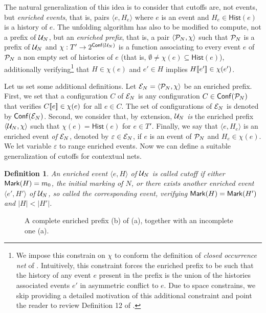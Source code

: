 \documentclass[11pt,a4paper]{article}
\newtheorem{definition}[theorem]{Definition}
\newcommand{\hist}[1]{\ensuremath{\mathsf{Hist}(#1)}}
\newcommand{\conf}[1]{\ensuremath{\mathsf{Conf}(#1)}}
\begin{document}
The natural generalization of this idea is to consider that cutoffs are, not
events, but \emph{enriched events}, that is, pairs $\langle e, H_e \rangle$
where $e$ is an event and $H_e \in \hist e$ is a history of $e$.  The unfolding
algorithm has also to be modified to compute, not a prefix of $\mathcal{U}_{N}$, but an
\emph{enriched prefix}, that is, a pair $\langle \mathcal{P}_{N}, \chi \rangle$ such
that $\mathcal{P}_{N}$ is a prefix of $\mathcal{U}_{N}$ and $\chi : T' \to 2^{\conf{\unf N}}$ is
a function associating to every event $e$ of $\mathcal{P}_{N}$ a non empty set of
histories of $e$ (that is, $\emptyset \not = \chi(e) \subseteq \hist{e}$),
additionally verifying\footnote{We impose this constrain on $\chi$ to conform
the definition of \emph{closed occurrence net} of .  Intuitively,
this constraint forces the enriched prefix to be such that the history of any
event $e$ present in the prefix is the union of the histories associated events
$e'$ in asymmetric conflict to $e$.  Due to space constrains, we skip providing
a detailed motivation of this additional constraint and point the reader to
review Definition 12 of .} that $H \in \chi (e)$ and $e' \in H$
implies $H [\![ e']\!] \in \chi (e')$.

Let us set some additional definitions. Let $\mathcal{E}_{N} = \langle \mathcal{P}_{N}, \chi
\rangle$ be an enriched prefix.  First, we set that a configuration $C$ of
$\mathcal{E}_{N}$ is any configuration $C \in \conf{\pref N}$ that verifies $C [\![ e]\!]
\in \chi (e)$ for all $e \in C$.  The set of configurations of $\mathcal{E}_{N}$ is
denoted by $\conf{\enr N}$.  Second, we consider that, by extension, $\mathcal{U}_{N}$
\emph{is} the enriched prefix $\langle \mathcal{U}_{N}, \chi \rangle$ such that $\chi
(e) = \hist{e}$ for $e \in T'$.  Finally, we say that $\langle e, H_e \rangle$
is an enriched event \emph{of} $\mathcal{E}_{N}$, denoted by $\varepsilon \in \mathcal{E}_{N}$,
if $e$ is an event of $\mathcal{P}_{N}$ and $H_e \in \chi (e)$.  We let variable
$\varepsilon$ to range enriched events.  Now we can define a suitable
generalization of cutoffs for contextual nets.

\begin{definition}
\label{def:cutoff}
An enriched event $\langle e, H \rangle$ of $\mathcal{U}_{N}$ is called \emph{cutoff} if
either $\mathsf{Mark }{(H)} = m_0$, the initial marking of $N$, or there exists another
enriched event $\langle e', H' \rangle$ of $\mathcal{U}_{N}$, so called the
\emph{corresponding event}, verifying $\mathsf{Mark }{(H)} = \mathsf{Mark }{(H')}$ and $|H| <
|H'|$.
\end{definition}

\begin{figure}[t]
\caption{A complete enriched prefix (b) of  (a), together with an
incomplete one (a).}
\label{fig:a.complete}
\end{figure}
\end{document}
